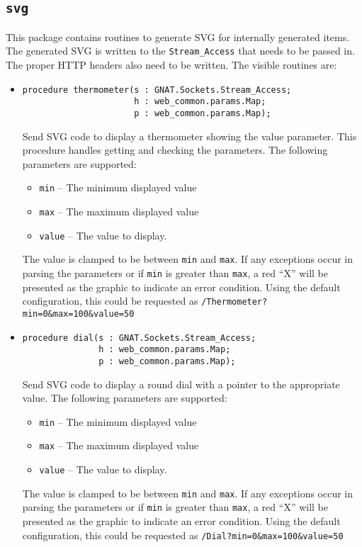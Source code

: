 \documentclass[10pt, openany]{book}
\begin{document}
\subsection{\texttt{svg}}
This package contains routines to generate SVG for internally generated items.  The generated SVG is written to the \texttt{Stream\_Access} that needs to be passed in.  The proper HTTP headers also need to be written.  The visible routines are:
\begin{itemize}
  \item \begin{lstlisting}
procedure thermometer(s : GNAT.Sockets.Stream_Access;
                      h : web_common.params.Map;
                      p : web_common.params.Map);
\end{lstlisting}
  Send SVG code to display a thermometer showing the value parameter.  This procedure handles getting and checking the parameters.  The following parameters are supported:
  \begin{itemize}
    \item \texttt{min} -- The minimum displayed value
    \item \texttt{max} -- The maximum displayed value
    \item \texttt{value} -- The value to display.
  \end{itemize}
  The value is clamped to be between \texttt{min} and \texttt{max}.  If any exceptions occur in parsing the parameters or if \texttt{min} is greater than \texttt{max}, a red ``X'' will be presented as the graphic to indicate an error condition.  Using the default configuration, this could be requested as \texttt{/Thermometer?min=0\&max=100\&value=50}
  \item \begin{lstlisting}
procedure dial(s : GNAT.Sockets.Stream_Access;
               h : web_common.params.Map;
               p : web_common.params.Map);
\end{lstlisting}
  Send SVG code to display a round dial with a pointer to the appropriate value. The following parameters are supported:
  \begin{itemize}
    \item \texttt{min} -- The minimum displayed value
    \item \texttt{max} -- The maximum displayed value
    \item \texttt{value} -- The value to display.
  \end{itemize}
  The value is clamped to be between \texttt{min} and \texttt{max}.  If any exceptions occur in parsing the parameters or if \texttt{min} is greater than \texttt{max}, a red ``X'' will be presented as the graphic to indicate an error condition.  Using the default configuration, this could be requested as \texttt{/Dial?min=0\&max=100\&value=50}
\end{itemize}
\end{document}
